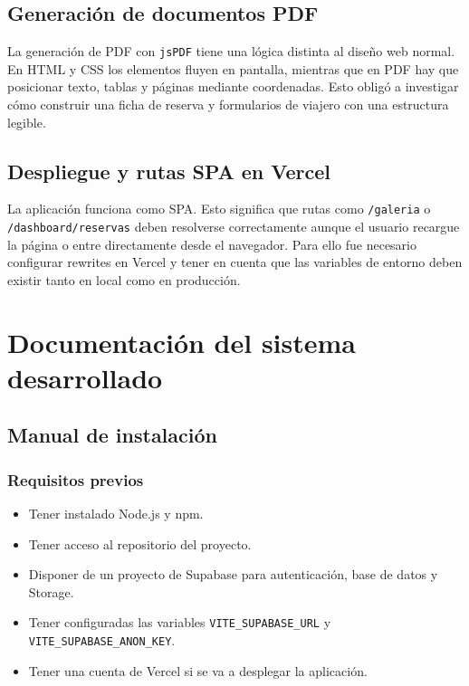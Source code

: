 \documentclass[11pt,a4paper]{article}
\begin{document}
\subsection{Generación de documentos PDF}
La generación de PDF con \texttt{jsPDF} tiene una lógica distinta al diseño web normal. En HTML y CSS los elementos fluyen en pantalla, mientras que en PDF hay que posicionar texto, tablas y páginas mediante coordenadas. Esto obligó a investigar cómo construir una ficha de reserva y formularios de viajero con una estructura legible.

\subsection{Despliegue y rutas SPA en Vercel}
La aplicación funciona como SPA. Esto significa que rutas como \texttt{/galeria} o \texttt{/dashboard/reservas} deben resolverse correctamente aunque el usuario recargue la página o entre directamente desde el navegador. Para ello fue necesario configurar rewrites en Vercel y tener en cuenta que las variables de entorno deben existir tanto en local como en producción.

\section{Documentación del sistema desarrollado}

\subsection{Manual de instalación}
\subsubsection{Requisitos previos}
\begin{itemize}[leftmargin=1.4cm]
  \item Tener instalado Node.js y npm.
  \item Tener acceso al repositorio del proyecto.
  \item Disponer de un proyecto de Supabase para autenticación, base de datos y Storage.
  \item Tener configuradas las variables \texttt{VITE\_SUPABASE\_URL} y \texttt{VITE\_SUPABASE\_ANON\_KEY}.
  \item Tener una cuenta de Vercel si se va a desplegar la aplicación.
\end{itemize}
\end{document}
